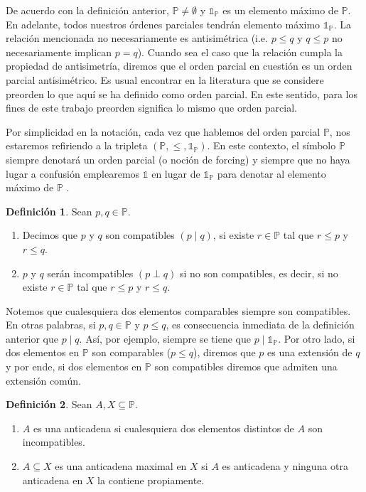 \documentclass[11pt]{unam_tesis1}
\theoremstyle{MyThmStyle}
\theoremstyle{definition}
\newtheorem{definition}{Definici\'on}[chapter]
\theoremstyle{plain}
\theoremstyle{remark}
\let\leq\leqslant
\begin{document}
De acuerdo con la definici\'on anterior, $\mathbb P\neq \emptyset$ y $\mathds 1_{\mathbb P}$ es un elemento m\'aximo de $\mathbb P$. En adelante, todos nuestros \'ordenes parciales tendr\'an elemento m\'aximo $\mathds 1_{\mathbb P}$. La relaci\'on mencionada no necesariamente es antisim\'etrica (i.e. $p\leq q$ y $q\leq p$ no necesariamente implican $p=q$). Cuando sea el caso que la relaci\'on cumpla la propiedad de antisimetr\'ia, diremos que el orden parcial en cuesti\'on es un orden parcial antisim\'etrico. Es usual encontrar en la literatura que se considere preorden lo que aqu\'i se ha definido como orden parcial. En este sentido, para los fines de este trabajo preorden significa lo mismo que orden parcial.

Por simplicidad en la notaci\'on, cada vez que hablemos del orden parcial $\mathbb P$, nos estaremos refiriendo a la tripleta $(\mathbb P,\leq,\mathds{1}_{\mathbb P})$. En este contexto, el s\'imbolo $\mathbb P$ siempre denotar\'a un orden parcial (o noci\'on de forcing) y siempre que no haya lugar a confusi\'on emplearemos $\mathds 1$ en lugar de $\mathds 1_{\mathbb P}$ para denotar al elemento m\'aximo de $\mathbb P$ .

\begin{definition}
Sean $p,q\in \mathbb P$.
\begin{enumerate}
\item Decimos que $p$ y $q$ son compatibles $(p\mid q)$, si existe $r\in \mathbb P$ tal que $r\leq p$ y $r\leq q$.
\item $p$ y $q$ ser\'an incompatibles $(p\perp q)$ si no son compatibles, es decir, si no existe $r\in \mathbb P$ tal que $r\leq p$ y $r\leq q$.
\end{enumerate}

\end{definition}

Notemos que cualesquiera dos elementos comparables siempre son compatibles. En otras palabras, si $p,q\in \mathbb P$ y $p\leq q$, es consecuencia inmediata de la definici\'on anterior que $p\mid q$. As\'i, por ejemplo, siempre se tiene que $p\mid \mathds{1}_{\mathbb P}$. Por otro lado, si dos elementos en $\mathbb P$ son comparables ($p\leq q$), diremos que $p$ es una extensi\'on de $q$ y por ende, si dos elementos en $\mathbb P$ son compatibles diremos que admiten una extensi\'on com\'un.

\begin{definition}
Sean $A,X\subseteq \mathbb P$.

\begin{enumerate}
\item $A$ es una anticadena si cualesquiera dos elementos distintos de $A$ son incompatibles.
\item $A\subseteq X$ es una anticadena maximal en $X$ si $A$ es anticadena y ninguna otra anticadena en $X$ la contiene propiamente.
\end{enumerate}
\end{definition}
\end{document}
